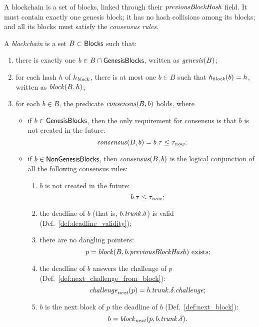 A blockchain is a set of blocks, linked through their ${\mathit{previousBlockHash}}$ field.
It must contain exactly one genesis block; it has no hash collisions among its blocks;
and all its blocks must satisfy the \emph{consensus rules}.
%
\begin{definition}\label{def:blockchain}
  A \emph{blockchain} is a set $B\subset{\mathsf{Blocks}}$ such that:
  \begin{enumerate}
  \item\label{prop:blockchain:genesis} there is exactly one $b\in B\cap{\mathsf{GenesisBlocks}}$, written as ${\mathit{genesis}}(B)$;
  \item\label{prop:blockchain:no_collision} for each hash $h$ of $h_{\mathit{block}}$, there is at most
    one $b\in B$ such that $h_{\mathit{block}}(b)=h$, written as ${\mathit{block}}(B,h)$;
  \item\label{prop:blockchain:consensus} for each $b\in B$, the predicate ${\mathit{consensus}}(B,b)$ holds, where
    \begin{itemize}
    \item if $b\in{\mathsf{GenesisBlocks}}$, then the only requirement for consensus is that
      $b$ is not created in the future:
      \[
      {\mathit{consensus}}(B,b)=b.\tau\le\tau_{\mathit{now}};
      \]
    \item if $b\in{\mathsf{NonGenesisBlocks}}$, then ${\mathit{consensus}}(B,b)$ is the logical conjunction
      of all the following consensus rules:
      \begin{enumerate}[label=(\alph*)]
      \item\label{prop:consensus:no_future} $b$ is not created in the future:
        \[
        b.\tau\le\tau_{\mathit{now}};
        \]
      \item\label{prop:consensus:valid} the deadline of $b$ (that is, $b.{\mathit{trunk}}.\delta$) is valid (Def.~\ref{def:deadline_validity});
      \item\label{prop:consensus:no_dangling} there are no dangling pointers:
        \[
        p={\mathit{block}}(B,b.{\mathit{previousBlockHash}})\text{ exists;}
        \]
      \item\label{prop:consensus:answer} the deadline of $b$ answers the challenge of $p$ (Def.~\ref{def:next_challenge_from_block}):
        \[
        {\mathit{challenge}}_{\mathit{next}}(p)=b.{\mathit{trunk}}.\delta.{\mathit{challenge}};
        \]
      \item\label{prop:consensus:next_block} $b$ is the next block of $p$ \wrt the deadline of $b$ (Def.~\ref{def:next_block}):
        \[
        b={\mathit{block}}_{\mathit{next}}(p,b.{\mathit{trunk}}.\delta).
        \]
      \end{enumerate}
    \end{itemize}
  \end{enumerate}
\end{definition}
